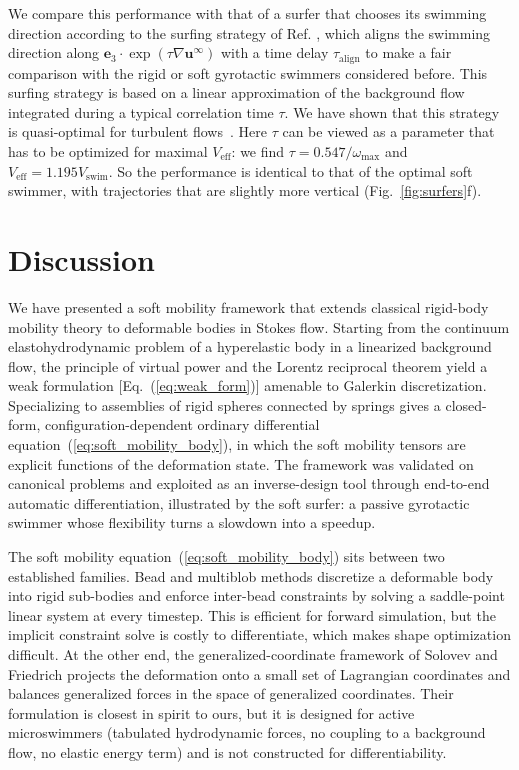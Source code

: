 \documentclass[aps,prfluids,groupedaddress]{revtex4-2}
\newcommand{\be}{\bm{e}}
\newcommand{\bu}{\bm{u}}
\begin{document}
We compare this performance with that of a surfer that chooses its swimming direction according to the surfing strategy of Ref. \cite{Monthiller2022}, which aligns the swimming direction along $\be_3\cdot\exp(\tau\nabla\bu^\infty)$ with a time delay $\tau_\mathrm{align}$ to make a fair comparison with the rigid or soft gyrotactic swimmers considered before. 
This surfing strategy is based on a linear approximation of the background flow integrated during a typical correlation time $\tau$. We have shown that this strategy is quasi-optimal for turbulent flows~\cite{Mecanna2025}.
Here $\tau$ can be viewed as a parameter that has to be optimized for maximal $V_\mathrm{eff}$: we find $\tau = 0.547 / \omega_\mathrm{max}$ and $V_\mathrm{eff}= 1.195 V_\mathrm{swim}$. So the performance is identical to that of the optimal soft swimmer, with trajectories that are slightly more vertical  (Fig.~\ref{fig:surfers}f).

\section{Discussion\label{sec.discussion}}

We have presented a soft mobility framework that extends classical rigid-body mobility theory to deformable bodies in Stokes flow. Starting from the continuum elastohydrodynamic problem of a hyperelastic body in a linearized background flow, the principle of virtual power and the Lorentz reciprocal theorem yield a weak formulation [Eq.~(\ref{eq:weak_form})] amenable to Galerkin discretization. Specializing to assemblies of rigid spheres connected by springs gives a closed-form, configuration-dependent ordinary differential equation~(\ref{eq:soft_mobility_body}), in which the soft mobility tensors are explicit functions of the deformation state. The framework was validated on canonical problems and exploited as an inverse-design tool through end-to-end automatic differentiation, illustrated by the soft surfer: a passive gyrotactic swimmer whose flexibility turns a slowdown into a speedup.


The soft mobility equation~(\ref{eq:soft_mobility_body}) sits between two established families. Bead and multiblob methods \cite{Delmotte2015,Balboa-Usabiaga2022,Fuchter2023} discretize a deformable body into rigid sub-bodies and enforce inter-bead constraints by solving a saddle-point linear system at every timestep. This is efficient for forward simulation, but the implicit constraint solve is costly to differentiate, which makes shape optimization difficult. At the other end, the generalized-coordinate framework of Solovev and Friedrich \cite{Solovev2021} projects the deformation onto a small set of Lagrangian coordinates and balances generalized forces in the space of generalized coordinates. Their formulation is closest in spirit to ours, but it is designed for active microswimmers (tabulated hydrodynamic forces, no coupling to a background flow, no elastic energy term) and is not constructed for differentiability.
\end{document}
